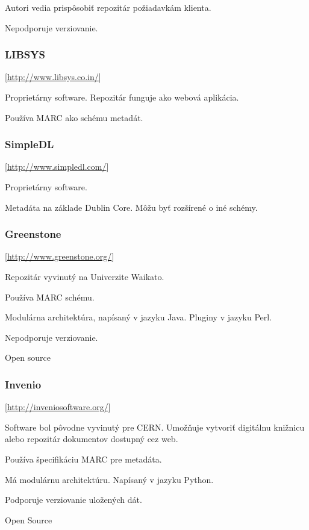 \documentclass[thesis=M,slovak]{FITthesis}[2013/05/06]
\begin{document}
Autori vedia prispôsobiť repozitár požiadavkám klienta.

Nepodporuje verziovanie.

\subsubsection {LIBSYS}  [\url{http://www.libsys.co.in/}]

Proprietárny software. Repozitár funguje ako webová aplikácia.

Používa MARC ako schému metadát.

\subsubsection {SimpleDL}  [\url{http://www.simpledl.com/}]

Proprietárny software.

Metadáta na základe Dublin Core. Môžu byť rozšírené o iné schémy.

\subsubsection {Greenstone}  [\url{http://www.greenstone.org/}]

Repozitár vyvinutý na Univerzite Waikato.

Používa MARC schému.

Modulárna architektúra, napísaný v jazyku Java. Pluginy v jazyku Perl.

Nepodporuje verziovanie.

Open source

\subsubsection {Invenio}  [\url{http://inveniosoftware.org/}]

Software bol pôvodne vyvinutý pre CERN. Umožňuje vytvoriť digitálnu knižnicu alebo repozitár dokumentov dostupný cez web. 

Používa špecifikáciu MARC pre metadáta.

Má modulárnu architektúru. Napísaný v jazyku Python.

Podporuje verziovanie uložených dát.

Open Source

%
\end{document}
